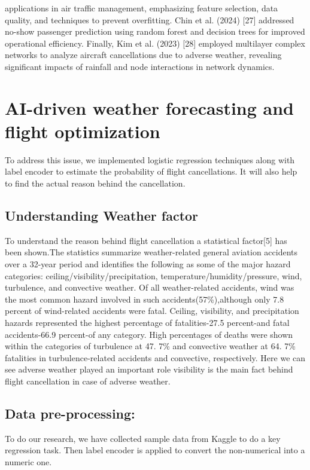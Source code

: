 \documentclass[conference]{IEEEtran}
\begin{document}
applications in air traffic management, emphasizing feature selection, data quality, and techniques to prevent overfitting. Chin et al. (2024) [27] addressed no-show passenger prediction using random forest and decision trees for improved operational efficiency. Finally, Kim et al. (2023) [28] employed multilayer complex networks to analyze aircraft cancellations due to adverse weather, revealing significant impacts of rainfall and node interactions in network dynamics.

\section{AI-driven weather forecasting and flight optimization}
To address this issue, we implemented logistic regression techniques along with  label encoder to estimate the probability of flight cancellations. It will also help to find the actual reason behind the cancellation.

\subsection{Understanding Weather factor}\label{AA}
To understand the reason behind flight cancellation a statistical factor[5] has been shown.The statistics summarize  weather-related general aviation accidents over a 32-year period and identifies the following as some of the major hazard categories: ceiling/visibility/precipitation, temperature/humidity/pressure, wind, turbulence, and convective weather. Of all weather-related accidents, wind was the most common hazard involved in such accidents(57\%),although only 7.8 percent of wind-related accidents were fatal. Ceiling, visibility, and precipitation hazards represented the highest percentage of fatalities-27.5 percent-and fatal accidents-66.9 percent-of any category. High percentages of deaths were shown within the categories of turbulence at 47. 7\% and convective weather at 64. 7\% fatalities in turbulence-related accidents and convective, respectively. Here we can see adverse weather played an important role  visibility  is the main fact behind flight cancellation in case of adverse weather.
\subsection{Data pre-processing:}
To do our research, we have collected  sample data from Kaggle to do a key regression task. Then label encoder is applied to convert the non-numerical into a numeric one.
\end{document}
